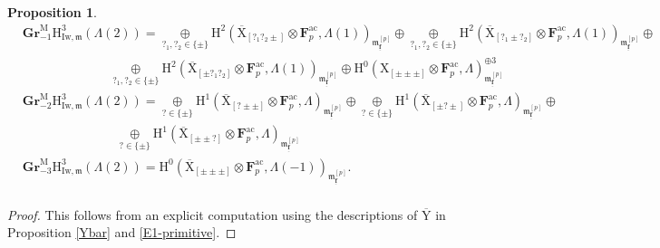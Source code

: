 \documentclass[10pt]{amsart}
\numberwithin{equation}{section}
\theoremstyle{plain}
\newtheorem{proposition}[theorem]{Proposition}
\numberwithin{equation}{section}
\theoremstyle{definition}
\theoremstyle{remark}
\def\ac{\mathrm{ac}}
\def\frakm{\mathfrak{m}}
\def\ac{\mathrm{ac}}
\def\triplef{\underline{\mathbf{f}}}
\def\frakm{\mathfrak{m}}
\def\FF{\mathbf{F}}
\def\rmH{\mathrm{H}}
\def\rmM{\mathrm{M}}
\def\rmX{\mathrm{X}}
\def\rmXbar{\overline{\rmX}}
\def\rmY{\mathrm{Y}}
\def\rmYbar{\overline{\rmY}}
\newcommand{\Iw}{\mathrm{Iw}}
\newcommand{\Gr}{\mathbf{Gr}}
\begin{document}
\begin{proposition}
\begin{equation*}
\begin{aligned}
&\Gr^{\rmM}_{-1}\rmH^{3}_{\Iw,\frakm}(\Lambda(2))=\underset{?_{1}, ?_{2}\in\{\pm\}}\oplus\rmH^{2}(\rmXbar_{[?_{1}?_{2}\pm]}\otimes{\FF^{\ac}_{p}}, \Lambda(1))_{\frakm^{[p]}_{\triplef}}\oplus \underset{?_{1}, ?_{2}\in\{\pm\}}\oplus\rmH^{2}(\rmXbar_{[?_{1}\pm?_{2}]}\otimes{\FF^{\ac}_{p}}, \Lambda(1))_{\frakm^{[p]}_{\triplef}}\oplus\\
&\phantom{aaaaaaaaaaaaa}\underset{?_{1}, ?_{2}\in\{\pm\}}\oplus\rmH^{2}(\rmXbar_{[\pm?_{1}?_{2}]}\otimes{\FF^{\ac}_{p}}, \Lambda(1))_{\frakm^{[p]}_{\triplef}}\oplus\rmH^{0}(\rmX_{[\pm\pm\pm]}\otimes\FF^{\ac}_{p}, \Lambda)^{\oplus3}_{\frakm^{[p]}_{\triplef}} \\
&\Gr^{\rmM}_{-2}\rmH^{3}_{\Iw,\frakm}(\Lambda(2))=\underset{?\in\{\pm\}}\oplus\rmH^{1}(\rmXbar_{[?\pm\pm]}\otimes{\FF^{\ac}_{p}}, \Lambda)_{\frakm^{[p]}_{\triplef}}\oplus \underset{?\in\{\pm\}}\oplus\rmH^{1}(\rmXbar_{[\pm?\pm]}\otimes{\FF^{\ac}_{p}}, \Lambda)_{\frakm^{[p]}_{\triplef}}\oplus\\
&\phantom{aaaaaaaaaaaaaa}\underset{?\in\{\pm\}}\oplus\rmH^{1}(\rmXbar_{[\pm\pm?]}\otimes{\FF^{\ac}_{p}}, \Lambda)_{\frakm^{[p]}_{\triplef}} \\
&\Gr^{\rmM}_{-3}\rmH^{3}_{\Iw,\frakm}(\Lambda(2))=\rmH^{0}(\rmXbar_{[\pm\pm\pm]}\otimes{\FF^{\ac}_{p}}, \Lambda(-1))_{\frakm^{[p]}_{\triplef}}.\\
\end{aligned}
\end{equation*}
\end{proposition}
\begin{proof}
This follows from an explicit computation using the descriptions of $\rmYbar$ in Proposition \ref{Ybar} and \ref{E1-primitive}.
\end{proof}
\end{document}
